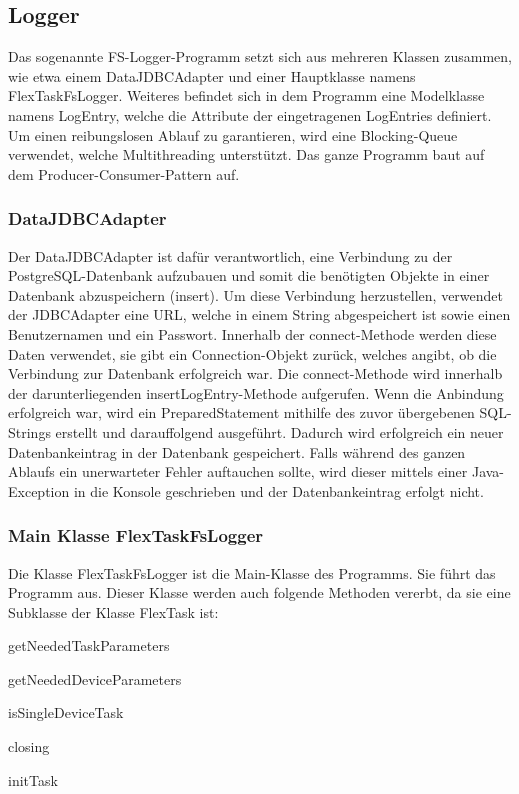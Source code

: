 \subsection{Logger}
Das sogenannte FS-Logger-Programm setzt sich aus mehreren Klassen zusammen, wie etwa einem DataJDBCAdapter und einer Hauptklasse namens FlexTaskFsLogger. Weiteres befindet sich in dem Programm eine Modelklasse namens LogEntry, welche die Attribute der eingetragenen LogEntries definiert. Um einen reibungslosen Ablauf zu garantieren, wird eine Blocking-Queue verwendet, welche Multithreading unterstützt. Das ganze Programm baut auf dem Producer-Consumer-Pattern auf.


\subsubsection{DataJDBCAdapter}
Der DataJDBCAdapter ist dafür verantwortlich, eine Verbindung zu der PostgreSQL-Datenbank aufzubauen und somit die benötigten Objekte in einer Datenbank abzuspeichern (insert). Um diese Verbindung herzustellen, verwendet der JDBCAdapter eine URL, welche in einem String abgespeichert ist sowie einen Benutzernamen und ein Passwort. Innerhalb der connect-Methode werden diese Daten verwendet, sie gibt ein Connection-Objekt zurück, welches angibt, ob die Verbindung zur Datenbank erfolgreich war. Die connect-Methode wird innerhalb der darunterliegenden insertLogEntry-Methode aufgerufen. Wenn die Anbindung erfolgreich war, wird ein PreparedStatement mithilfe des zuvor übergebenen SQL-Strings erstellt und darauffolgend ausgeführt. Dadurch wird erfolgreich ein neuer Datenbankeintrag in der Datenbank gespeichert. Falls während des ganzen Ablaufs ein unerwarteter Fehler auftauchen sollte, wird dieser mittels einer Java-Exception in die Konsole geschrieben und der Datenbankeintrag erfolgt nicht.


\subsubsection{Main Klasse FlexTaskFsLogger}
Die Klasse FlexTaskFsLogger ist die Main-Klasse des Programms. Sie führt das Programm aus. Dieser Klasse werden auch folgende Methoden vererbt, da sie eine Subklasse der Klasse FlexTask ist:
\begin{compactitem}
\item getNeededTaskParameters
\item getNeededDeviceParameters
\item isSingleDeviceTask
\item closing
\item initTask
\end{compactitem}


